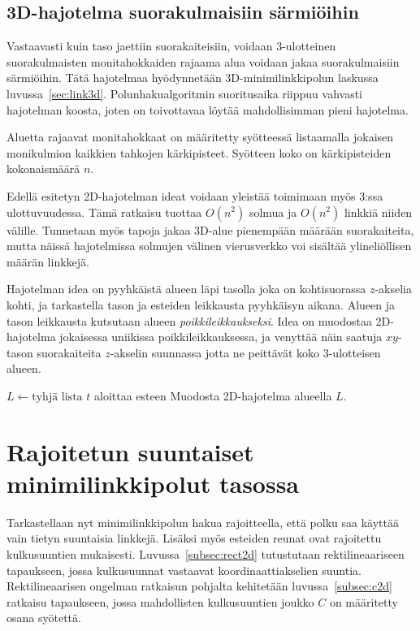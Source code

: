 \documentclass[finnish]{tktltiki2}
\theoremstyle{definition}
\theoremstyle{remark}
\begin{document}
\subsection{3D-hajotelma suorakulmaisiin särmiöihin}

Vastaavasti kuin taso jaettiin suorakaiteisiin, voidaan 3-ulotteinen suorakulmaisten monitahokkaiden rajaama alua voidaan jakaa suorakulmaisiin särmiöihin.
Tätä hajotelmaa hyödynnetään 3D-minimilinkkipolun laskussa luvussa~\ref{sec:link3d}.
Polunhakualgoritmin suoritusaika riippuu vahvasti hajotelman koosta, joten on toivottavaa löytää mahdollisimman pieni hajotelma.

Aluetta rajaavat monitahokkaat on määritetty syötteessä listaamalla jokaisen monikulmion kaikkien tahkojen kärkipisteet.
Syötteen koko on kärkipisteiden kokonaismäärä $n$.

Edellä esitetyn 2D-hajotelman ideat voidaan yleistää toimimaan myös 3:ssa ulottuvuudessa.
Tämä ratkaisu tuottaa $O(n^2)$ solmua ja $O(n^2)$ linkkiä niiden välille.
Tunnetaan myös tapoja jakaa 3D-alue pienempään määrään suorakaiteita, mutta näissä hajotelmissa solmujen välinen vierusverkko voi sisältää ylineliöllisen määrän linkkejä.

Hajotelman idea on pyyhkäistä alueen läpi tasolla joka on kohtisuorassa $z$-akselia kohti, ja tarkastella tason ja esteiden leikkausta pyyhkäisyn aikana.
Alueen ja tason leikkausta kutsutaan alueen \emph{poikkileikkaukseksi}.
Idea on muodostaa 2D-hajotelma jokaisessa uniikissa poikkileikkauksessa, ja venyttää näin saatuja $xy$-tason suorakaiteita $z$-akselin suunnassa jotta ne peittävät koko 3-ulotteisen alueen.

\begin{algorithmic}\label{jako3d}
\State $L \gets \text{tyhjä lista}$
	\If $t$ aloittaa esteen
	\Else
	\EndIf
	\State Muodosta 2D-hajotelma alueella $L$.
\EndFor
\end{algorithmic}



\section{Rajoitetun suuntaiset minimilinkkipolut tasossa}\label{sec:limited2d}

Tarkastellaan nyt minimilinkkipolun hakua rajoitteella, että polku saa käyttää vain tietyn suuntaisia linkkejä.
Lisäksi myös esteiden reunat ovat rajoitettu kulkusuuntien mukaisesti.
Luvussa~\ref{subsec:rect2d} tutustutaan rektilineaariseen tapaukseen, jossa kulkusuunnat vastaavat koordinaattiakselien suuntia.
Rektilineaarisen ongelman ratkaisun pohjalta kehitetään luvussa~\ref{subsec:c2d} ratkaisu tapaukseen, jossa mahdollisten kulkusuuntien joukko $C$ on määritetty osana syötettä.
\end{document}
